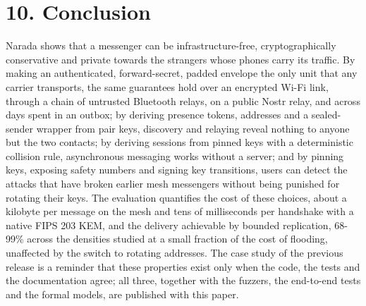 \documentclass[conference]{IEEEtran}
\begin{document}
\section{10. Conclusion}
Narada shows that a messenger can be infrastructure-free, cryptographically conservative and private towards the strangers whose phones carry its traffic. By making an authenticated, forward-secret, padded envelope the only unit that any carrier transports, the same guarantees hold over an encrypted Wi-Fi link, through a chain of untrusted Bluetooth relays, on a public Nostr relay, and across days spent in an outbox; by deriving presence tokens, addresses and a sealed-sender wrapper from pair keys, discovery and relaying reveal nothing to anyone but the two contacts; by deriving sessions from pinned keys with a deterministic collision rule, asynchronous messaging works without a server; and by pinning keys, exposing safety numbers and signing key transitions, users can detect the attacks that have broken earlier mesh messengers without being punished for rotating their keys. The evaluation quantifies the cost of these choices, about a kilobyte per message on the mesh and tens of milliseconds per handshake with a native FIPS 203 KEM, and the delivery achievable by bounded replication, 68-99\% across the densities studied at a small fraction of the cost of flooding, unaffected by the switch to rotating addresses. The case study of the previous release is a reminder that these properties exist only when the code, the tests and the documentation agree; all three, together with the fuzzers, the end-to-end tests and the formal models, are published with this paper.
\end{document}
